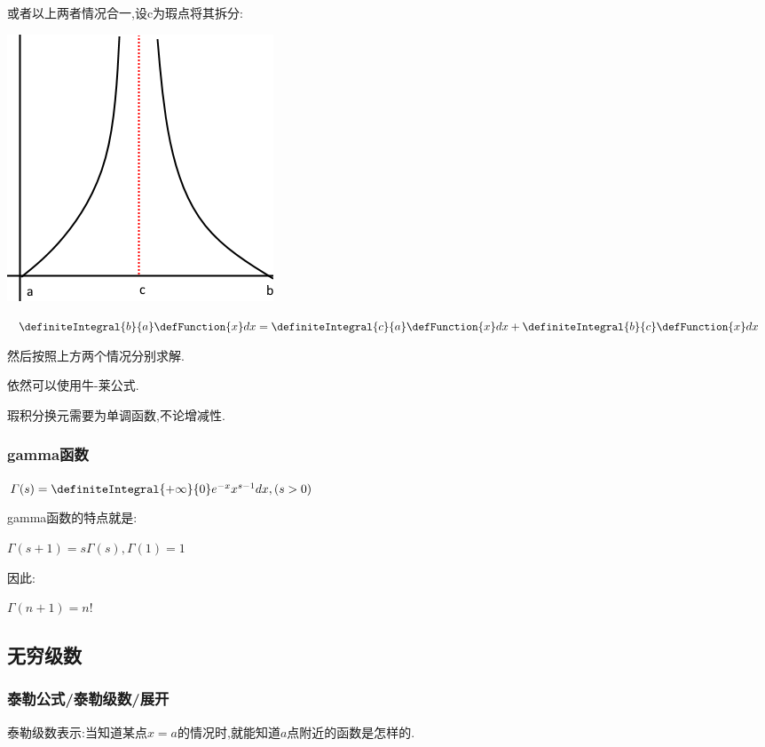 {{{  或者以上两者情况合一,设c为瑕点将其拆分:

  \begin{center}
    \includegraphics{resources/infityFunctionUnormalIntegral3.png}
  \end{center}

  $\definiteIntegral{b}{a}\defFunction{x}dx = \definiteIntegral{c}{a}\defFunction{x}dx + \definiteIntegral{b}{c}\defFunction{x}dx$

  然后按照上方两个情况分别求解.

  依然可以使用牛-莱公式.

  瑕积分换元需要为单调函数,不论增减性.

}%

\subsubsection{gamma函数}{
$\varGamma(s) = \definiteIntegral{+\infty}{0}e^{-x}x^{s-1}dx, (s > 0)$

gamma函数的特点就是:

$\varGamma(s + 1) = s\varGamma(s), \varGamma(1) = 1$

因此:

$\varGamma(n+1) = n!$

}%

}%

\subsection{无穷级数}{

\subsubsection{泰勒公式/泰勒级数/展开}{
泰勒级数表示:当知道某点$x = a$的情况时,就能知道$a$点附近的函数是怎样的.

}}}
